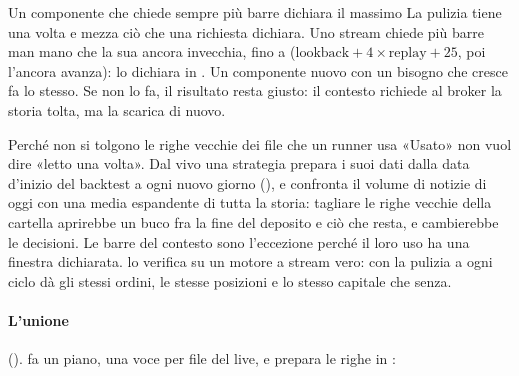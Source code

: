 \begin{attenzione}{Un componente che chiede sempre più barre dichiara il massimo}
La pulizia tiene una volta e mezza ciò che una richiesta dichiara. Uno stream
chiede più barre man mano che la sua ancora invecchia, fino a
 ($\text{lookback} + 4 \times \text{replay} + 25$, poi
l'ancora avanza): lo dichiara in . Un componente nuovo con un bisogno che cresce fa lo stesso. Se non
lo fa, il risultato resta giusto: il contesto richiede al broker la storia
tolta, ma la scarica di nuovo.
\end{attenzione}

\begin{perche}{Perché non si tolgono le righe vecchie dei file che un runner usa}
«Usato» non vuol dire «letto una volta». Dal vivo una strategia prepara i suoi
dati dalla data d'inizio del backtest a ogni nuovo giorno
(), e  confronta il volume di
notizie di oggi con una media espandente di tutta la storia: tagliare le
righe vecchie della cartella aprirebbe un buco fra la fine del deposito e ciò
che resta, e cambierebbe le decisioni. Le barre del contesto sono l'eccezione
perché il loro uso ha una finestra dichiarata.
 lo verifica su un motore a stream vero:
con la pulizia a ogni ciclo dà gli stessi ordini, le stesse posizioni e lo
stesso capitale che senza.
\end{perche}

\paragraph{L'unione} ().  fa un
piano, una voce per file del live, e prepara le righe in
:

